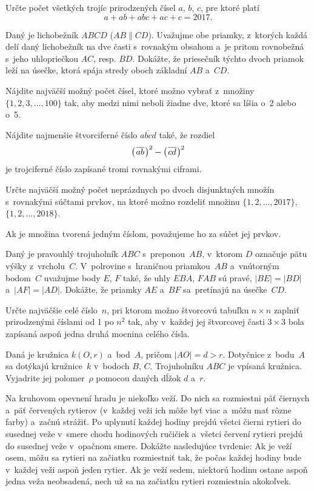 {%
Určte počet všetkých trojíc prirodzených čísel $a$, $b$, $c$, pre ktoré platí
$$a+ab+abc+ac+c=2017.$$}

{%
Daný je lichobežník $ABCD$ ($AB\parallel CD$). Uvažujme obe priamky, z~ktorých každá delí daný lichobežník na dve časti s~rovnakým obsahom a~je pritom rovnobežná s~jeho uhlopriečkou $AC$,
resp. $BD$. Dokážte, že priesečník týchto dvoch priamok leží na úsečke, ktorá spája stredy oboch základní $AB$ a~$CD$.}

{%
Nájdite najväčší možný počet čísel, ktoré možno vybrať z~množiny $\{1,2,3,\dots,100\}$ tak, aby medzi nimi neboli žiadne dve, ktoré sa líšia o~2 alebo o~5.}

{%
Nájdite najmenšie štvorciferné číslo $\overline{abcd}$ také, že rozdiel
$${\bigl(\hskip 1pt\overline{ab}\hskip 1pt\bigr)^2-\bigl(\hskip 1pt\overline{cd}\hskip 1pt\bigr)^2}$$ je trojciferné číslo zapísané tromi rovnakými ciframi.}

{%
Určte najväčší možný počet neprázdnych po dvoch disjunktných množín s~rovnakými súčtami prvkov, na ktoré možno rozdeliť množinu
 $\{1,2,...,2017\}$,
 $\{1,2,...,2018\}$.

Ak je množina tvorená jedným číslom, považujeme ho za súčet jej prvkov.
}

{%
Daný je pravouhlý trojuholník $ABC$ s~preponou~$AB$, v~ktorom $D$ označuje pätu výšky z~vrcholu~$C$. V~polrovine s~hraničnou priamkou~$AB$ a~vnútorným bodom~$C$ uvažujme body $E$, $F$ také, že uhly $EBA$, $FAB$ sú pravé, $|BE|=|BD|$ a~$|AF|=|AD|$. Dokážte, že priamky $AE$ a~$BF$ sa~pretínajú na úsečke~$CD$.}

{%
Určte najväčšie celé číslo~$n$, pri ktorom možno štvorcovú tabuľku $n\times n$ zaplniť prirodzenými číslami od 1 po $n^2$ tak, aby v~každej jej štvorcovej časti $3\times3$ bola zapísaná aspoň jedna druhá mocnina celého čísla.}

{%
Daná je kružnica $k(O,r)$ a~bod~$A$, pričom $|AO| = d > r$. Dotyčnice z~bodu~$A$ sa dotýkajú kružnice~$k$ v~bodoch $B$, $C$. Trojuholníku $ABC$ je vpísaná kružnica. Vyjadrite jej polomer~$\rho$ pomocou daných dĺžok $d$ a~$r$.}

{%
Na kruhovom opevnení hradu je niekoľko veží. Do nich sa rozmiestni päť čiernych a~päť červených rytierov (v~každej veži ich môže byť viac a~môžu mať rôzne farby) a~začnú strážiť. Po uplynutí každej hodiny prejdú všetci čierni rytieri do susednej veže v~smere chodu hodinových ručičiek a~všetci červení rytieri prejdú do susednej veže v~opačnom smere. Dokážte nasledujúce tvrdenie:
 Ak je veží osem, môžu sa rytieri na začiatku rozmiestniť tak, že počas každej hodiny bude v~každej veži aspoň jeden rytier.
 Ak je veží sedem, niektorú hodinu ostane aspoň jedna veža neobsadená, nech už sa na začiatku rytieri rozmiestnia akokoľvek.\endgraf
}


